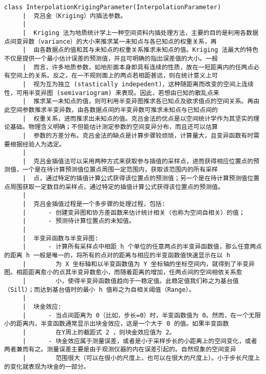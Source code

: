 \documentclass[11pt]{article}
\begin{document}
\begin{Verbatim}[commandchars=\\\{\}]
    class InterpolationKrigingParameter(InterpolationParameter)
     |  克吕金（Kriging）内插法参数。
     |  
     |  Kriging 法为地质统计学上一种空间资料内插处理方法，主要的目的是利用各数据点间变异数（variance）的大小来推求某一未知点与各已知点的权重关系，再
     |  由各数据点的值和其与未知点的权重关系推求未知点的值。Kriging 法最大的特色不仅是提供一个最小估计误差的预测值，并且可明确的指出误差值的大小。一般
     |  而言，许多地质参数，如地形面本身即具有连续的性质，故在一短距离内的任两点必有空间上的关系。反之，在一不规则面上的两点若相距甚远，则在统计意义上可
     |  视为互为独立 (stastically indepedent)，这种随距离而改变的空间上连续性，可用半变异图 (semivariogram) 来表现。因此，若想由已知的散乱点来
     |  推求某一未知点的值，则可利用半变异图推求各已知点及欲求值点的空间关系。再由此空间参数推求半变异数，由各数据点间的半变异数可推求未知点与已知点间的
     |  权重关系，进而推求出未知点的值。克吕金法的优点是以空间统计学作为其坚实的理论基础。物理含义明确；不但能估计测定参数的空间变异分布，而且还可以估算
     |  参数的方差分布。克吕金法的缺点是计算步骤较烦琐，计算量大，且变异函数有时需要根据经验人为选定。
     |  
     |  克吕金插值法可以采用两种方式来获取参与插值的采样点，进而获得相应位置点的预测值，一个是在待计算预测值位置点周围一定范围内，获取该范围内的所有采样
     |  点，通过特定的插值计算公式获得该位置点的预测值；另一个是在待计算预测值位置点周围获取一定数目的采样点，通过特定的插值计算公式获得该位置点的预测值。
     |  
     |  克吕金插值过程是一个多步骤的处理过程，包括:
     |      - 创建变异图和协方差函数来估计统计相关（也称为空间自相关）的值；
     |      - 预测待计算位置点的未知值。
     |  
     |  半变异函数与半变异图:
     |      - 计算所有采样点中相距 h 个单位的任意两点的半变异函数值，那么任意两点的距离 h 一般是唯一的，将所有的点对的距离与相应的半变函数值快速显示在以 h
     |        为 X 坐标轴和以半变函数值为 Y 坐标轴的坐标空间内，就得到了半变异图。相距距离愈小的点其半变异数愈小，而随着距离的增加，任两点间的空间相依关系愈
     |        小，使得半变异函数值趋向于一稳定值。此稳定值我们称之为基台值（Sill）；而达到基台值时的最小 h 值称之为自相关阈值（Range）。
     |  
     |  块金效应:
     |      - 当点间距离为 0（比如，步长=0）时，半变函数值为 0。然而，在一个无限小的距离内，半变函数通常显示出块金效应，这是一个大于 0 的值。如果半变函数
     |        在Y周上的截距式 2 ，则块金效应值为 2。
     |      - 块金效应属于测量误差，或者是小于采样步长的小距离上的空间变化，或者两者兼而有之。测量误差主要是由于观测仪器的内在误差引起的。自然现象的空间变异
     |        范围很大（可以在很小的尺度上，也可以在很大的尺度上）。小于步长尺度上的变化就表现为块金的一部分。

\end{Verbatim}
\end{document}
